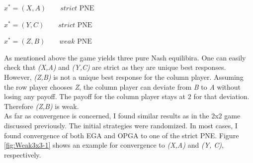 \begin{description}\centering
    \item $x^{*} = (X,A) \qquad \textit{strict }\text{PNE}$
    \item $x^{*} = (Y,C) \qquad \textit{strict }\text{PNE}$
    \item $x^{*} = (Z,B) \qquad \textit{weak }\text{PNE}$
\end{description}

As mentioned above the game yields three pure Nash equilibira. One can easily check that \textit{(X,A)} and \textit{(Y,C)} are strict as they are unique best responses. However, \textit{(Z,B)} is not a unique best response for the column player. Assuming the row player chooses \textit{Z}, the column player can deviate from \textit{B} to \textit{A} without losing any payoff. The payoff for the column player stays at $2$ for that deviation. Therefore \textit{(Z,B)} is weak. \\

As far as convergence is concerned, I found similar results as in the 2x2 game discussed previously. The initial strategies were randomized. In most cases, I found convergence of both EGA and OPGA to one of the strict PNE. Figure \ref{fig:Weak3x3-1} shows an example for convergence to \textit{(X,A)} and \textit{(Y, C)}, respectively.  \\

